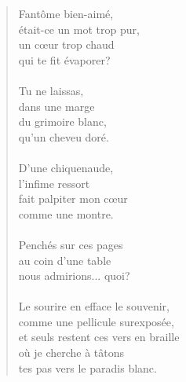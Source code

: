 \documentclass[twocolumn,11pt]{article}
\begin{document}
\begin{verse}
  Fantôme bien-aimé, \\
  était-ce un mot trop pur, \\
  un c{\oe}ur trop chaud \\
  qui te fit évaporer? \\
  \ \\
  Tu ne laissas, \\
  dans une marge \\
  du grimoire blanc, \\
  qu'un cheveu doré. \\
  \ \\
  D'une chiquenaude, \\
  l'infime ressort \\
  fait palpiter mon c{\oe}ur \\
  comme une montre. \\%
  \ \\
  Penchés sur ces pages \\
  au coin d'une table \\
  nous admirions... quoi? \\
  \ \\
  Le sourire en efface le souvenir, \\
  comme une pellicule surexposée, \\
  et seuls restent ces vers en braille \\
  où je cherche à tâtons \\
  tes pas vers le paradis blanc.
\end{verse}
\end{document}
